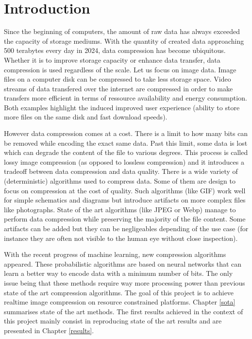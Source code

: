 \chapter*{Introduction}
Since the beginning of computers, the amount of raw data has always exceeded the capacity of storage mediums. With the quantity of created data approaching 500 terabytes every day in 2024, data compression has become ubiquitous. Whether it is to improve storage capacity or enhance data transfer, data compression is used regardless of the scale. Let us focus on image data. Image files on a computer disk can be compressed to take less storage space. Video streams of data transfered over the internet are compressed in order to make transfers more efficient in terms of ressource availability and energy consumption. Both examples highlight the induced improved user experience (ability to store more files on the same disk and fast download speeds).

However data compression comes at a cost. There is a limit to how many bits can be removed while encoding the exact same data. Past this limit, some data is lost which can degrade the content of the file to various degrees. This process is called lossy image compression (as opposed to lossless compression) and it introduces a tradeoff between data compression and data quality. There is a wide variety of (deterministic) algorithms used to compress data. Some of them are design to focus on compression at the cost of quality. Such algorithms (like GIF) work well for simple schematics and diagrams but introduce artifacts on more complex files like photographs. State of the art algorithms (like JPEG or Webp) manage to perform data compression while preserving the majority of the file content. Some artifacts can be added but they can be negligeables depending of the use case (for instance they are often not visible to the human eye without close inspection).

With the recent progress of machine learning, new compression algorithms appeared. These probabilistic algorithms are based on neural networks that can learn a better way to encode data with a minimum number of bits. The only issue being that these methods require way more processing power than previous state of the art compression algorithms. The goal of this project is to achieve realtime image compression on resource constrained platforms. Chapter \ref{sota} summarises state of the art methods. The first results achieved in the context of this project mainly consist in reproducing state of the art results and are presented in Chapter \ref{results}.
